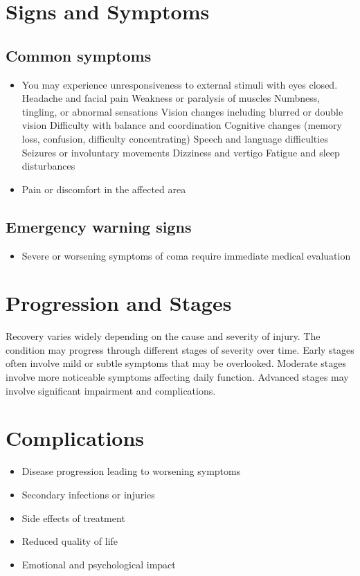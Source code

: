 \section{Signs and Symptoms}

\subsection{Common symptoms}
\begin{itemize}[noitemsep]
  \item You may experience unresponsiveness to external stimuli with eyes closed. Headache and facial pain Weakness or paralysis of muscles Numbness, tingling, or abnormal sensations Vision changes including blurred or double vision Difficulty with balance and coordination Cognitive changes (memory loss, confusion, difficulty concentrating) Speech and language difficulties Seizures or involuntary movements Dizziness and vertigo Fatigue and sleep disturbances

  \item Pain or discomfort in the affected area
  \end{itemize}

\subsection{Emergency warning signs}
\begin{itemize}[noitemsep]
  \item Severe or worsening symptoms of coma require immediate medical evaluation
\end{itemize}
\section{Progression and Stages}
Recovery varies widely depending on the cause and severity of injury. The condition may progress through different stages of severity over time. Early stages often involve mild or subtle symptoms that may be overlooked. Moderate stages involve more noticeable symptoms affecting daily function. Advanced stages may involve significant impairment and complications.
\section{Complications}
\begin{itemize}[noitemsep]
  \item Disease progression leading to worsening symptoms
  \item Secondary infections or injuries
  \item Side effects of treatment
  \item Reduced quality of life
  \item Emotional and psychological impact
\end{itemize}
